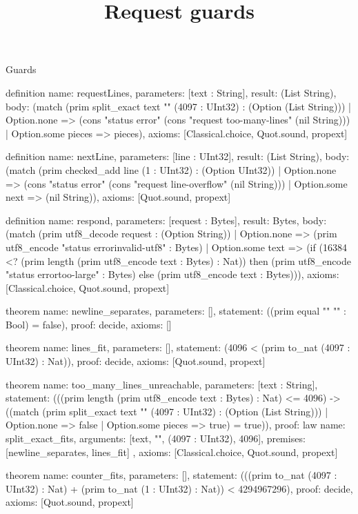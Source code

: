 \begin{lexlean}{Guards}
\title{Request guards}
\begin{semanticmodule}
definition{
  name: requestLines,
  parameters: [text : String],
  result: (List String),
  body: (match (prim split_exact text "\n" (4097 : UInt32) : (Option (List String)))
    | Option.none => (cons "status error" (cons "request too-many-lines" (nil String)))
    | Option.some pieces => pieces),
  axioms: [Classical.choice, Quot.sound, propext]
}

definition{
  name: nextLine,
  parameters: [line : UInt32],
  result: (List String),
  body: (match (prim checked_add line (1 : UInt32) : (Option UInt32))
    | Option.none => (cons "status error" (cons "request line-overflow" (nil String)))
    | Option.some next => (nil String)),
  axioms: [Quot.sound, propext]
}

definition{
  name: respond,
  parameters: [request : Bytes],
  result: Bytes,
  body: (match (prim utf8_decode request : (Option String))
    | Option.none => (prim utf8_encode "status error\nrequest invalid-utf8" : Bytes)
    | Option.some text => (if (16384 <? (prim length (prim utf8_encode text : Bytes) : Nat)) then (prim utf8_encode "status error\nresponse too-large" : Bytes) else (prim utf8_encode text : Bytes))),
  axioms: [Classical.choice, Quot.sound, propext]
}

theorem{
  name: newline_separates,
  parameters: [],
  statement: ((prim equal "\n" "" : Bool) = false),
  proof: decide{},
  axioms: []
}

theorem{
  name: lines_fit,
  parameters: [],
  statement: (4096 < (prim to_nat (4097 : UInt32) : Nat)),
  proof: decide{},
  axioms: [Quot.sound, propext]
}

theorem{
  name: too_many_lines_unreachable,
  parameters: [text : String],
  statement: (((prim length (prim utf8_encode text : Bytes) : Nat) <= 4096) -> ((match (prim split_exact text "\n" (4097 : UInt32) : (Option (List String)))
    | Option.none => false
    | Option.some pieces => true) = true)),
  proof: law{
    name: split_exact_fits,
    arguments: [text, "\n", (4097 : UInt32), 4096],
    premises: [newline_separates, lines_fit]
  },
  axioms: [Classical.choice, Quot.sound, propext]
}

theorem{
  name: counter_fits,
  parameters: [],
  statement: (((prim to_nat (4097 : UInt32) : Nat) + (prim to_nat (1 : UInt32) : Nat)) < 4294967296),
  proof: decide{},
  axioms: [Quot.sound, propext]
}


\end{semanticmodule}
\end{lexlean}
